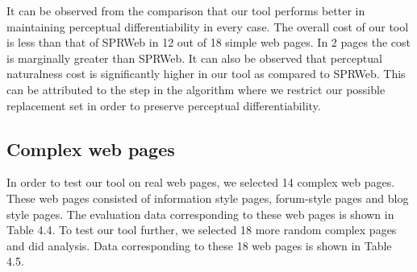 It can be observed from the comparison that our tool performs better in maintaining perceptual differentiability in every case. The overall cost of our tool is less than that of SPRWeb in 12 out of 18 simple web pages. In 2 pages the cost is marginally greater than SPRWeb. It can also be observed that perceptual naturalness cost is significantly higher in our tool as compared to SPRWeb. This can be attributed to the step in the algorithm where we restrict our possible replacement set in order to preserve perceptual differentiability. 


\subsection{Complex web pages}
\label{Complex web pages}
In order to test our tool on real web pages, we selected 14 complex web pages. These web pages consisted of information style pages, forum-style pages and blog style pages. The evaluation data corresponding to these web pages is shown in Table 4.4. 
To test our tool further, we selected 18 more random complex pages and did analysis. Data corresponding to these 18 web pages is shown in Table 4.5. 


